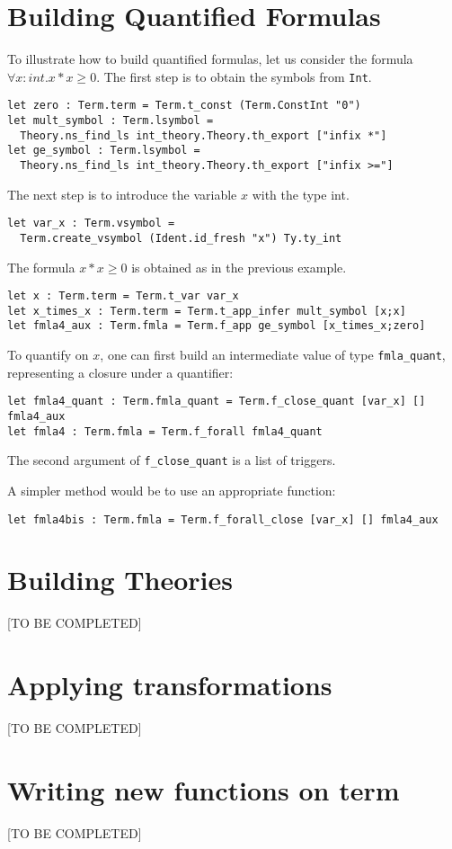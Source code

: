 \section{Building Quantified Formulas}

To illustrate how to build quantified formulas, let us consider
the formula $\forall x:int. x*x \geq 0$. The first step is to
obtain the symbols from \texttt{Int}.
\begin{verbatim}
let zero : Term.term = Term.t_const (Term.ConstInt "0")
let mult_symbol : Term.lsymbol =
  Theory.ns_find_ls int_theory.Theory.th_export ["infix *"]
let ge_symbol : Term.lsymbol =
  Theory.ns_find_ls int_theory.Theory.th_export ["infix >="]
\end{verbatim}
The next step is to introduce the variable $x$ with the type int.
\begin{verbatim}
let var_x : Term.vsymbol =
  Term.create_vsymbol (Ident.id_fresh "x") Ty.ty_int
\end{verbatim}
The formula $x*x \geq 0$ is obtained as in the previous example.
\begin{verbatim}
let x : Term.term = Term.t_var var_x
let x_times_x : Term.term = Term.t_app_infer mult_symbol [x;x]
let fmla4_aux : Term.fmla = Term.f_app ge_symbol [x_times_x;zero]
\end{verbatim}
To quantify on $x$, one can first build an intermediate
value of type \texttt{fmla\_quant}, representing a closure
under a quantifier:
\begin{verbatim}
let fmla4_quant : Term.fmla_quant = Term.f_close_quant [var_x] [] fmla4_aux
let fmla4 : Term.fmla = Term.f_forall fmla4_quant
\end{verbatim}
The second argument of \texttt{f\_close\_quant} is a list of triggers.

A simpler method would be to use an appropriate function:
\begin{verbatim}
let fmla4bis : Term.fmla = Term.f_forall_close [var_x] [] fmla4_aux
\end{verbatim}

\section{Building Theories}

[TO BE COMPLETED]

\section{Applying transformations}

[TO BE COMPLETED]

\section{Writing new functions on term}

[TO BE COMPLETED]





